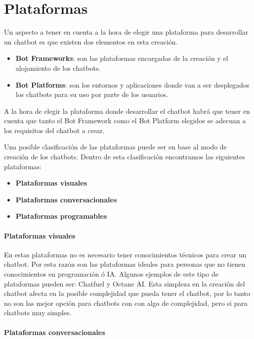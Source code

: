 \chapter{Plataformas}

Un aspecto a tener en cuenta a la hora de elegir una plataforma para desarrollar un chatbot es que existen dos elementos en esta creación.

\begin{itemize}
    \item \textbf{Bot Frameworks}: son las plataformas encargadas de la creación y el alojamiento de los chatbots.
    \item \textbf{Bot Platforms}: son los entornos y aplicaciones donde van a ser desplegados los chatbots para su uso por parte de los usuarios.
\end{itemize}

A la hora de elegir la plataforma donde desarrollar el chatbot habrá que tener en cuenta que tanto el Bot Framework como el Bot Platform elegidos se adecuan a los requisitos del chatbot a crear.

Una posible clasificación de las plataformas puede ser en base al modo de creación de los chatbots. Dentro de esta clasificación encontramos las siguientes plataformas:

\begin{itemize}
    \item \textbf{Plataformas visuales}
    \item \textbf{Plataformas conversacionales}
    \item \textbf{Plataformas programables}
\end{itemize}

\subsubsection*{Plataformas visuales}

En estas plataformas no es necesario tener conocimientos técnicos para crear un chatbot. Por esta razón son las plataformas ideales para personas que no tienen conocimientos en programación ó IA. Algunos ejemplos de este tipo de plataformas pueden ser: Chatfuel y Octane AI. Esta simpleza en la creación del chatbot afecta en la posible complejidad que pueda tener el chatbot, por lo tanto no son las mejor opción para chatbots con con algo de complejidad, pero si para chatbots muy simples.

\subsubsection*{Plataformas conversacionales}

